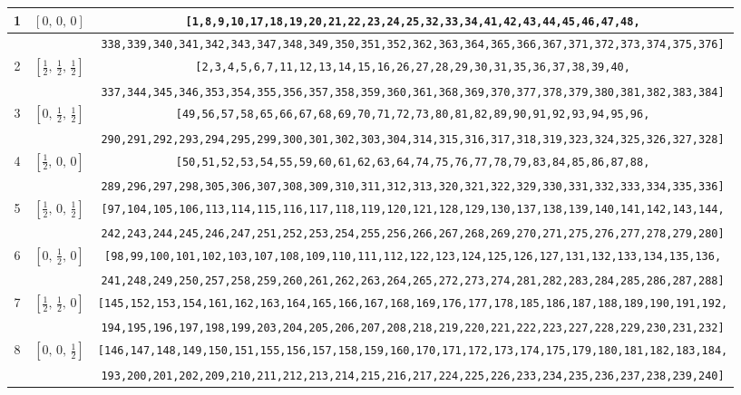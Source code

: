 \documentclass[fleqn,8pt]{jsarticle}
\begin{document}
\begin{longtable}{ccc}
1 & $\left[ 0,\, 0,\, 0 \right]$ & {\tt [1,8,9,10,17,18,19,20,21,22,23,24,25,32,33,34,41,42,43,44,45,46,47,48,} \\ \hline
 &  & {\tt 338,339,340,341,342,343,347,348,349,350,351,352,362,363,364,365,366,367,371,372,373,374,375,376]} \\ \hline
2 & $\left[ \frac{1}{2},\, \frac{1}{2},\, \frac{1}{2} \right]$ & {\tt [2,3,4,5,6,7,11,12,13,14,15,16,26,27,28,29,30,31,35,36,37,38,39,40,} \\ \hline
 &  & {\tt 337,344,345,346,353,354,355,356,357,358,359,360,361,368,369,370,377,378,379,380,381,382,383,384]} \\ \hline
3 & $\left[ 0,\, \frac{1}{2},\, \frac{1}{2} \right]$ & {\tt [49,56,57,58,65,66,67,68,69,70,71,72,73,80,81,82,89,90,91,92,93,94,95,96,} \\ \hline
 &  & {\tt 290,291,292,293,294,295,299,300,301,302,303,304,314,315,316,317,318,319,323,324,325,326,327,328]} \\ \hline
4 & $\left[ \frac{1}{2},\, 0,\, 0 \right]$ & {\tt [50,51,52,53,54,55,59,60,61,62,63,64,74,75,76,77,78,79,83,84,85,86,87,88,} \\ \hline
 &  & {\tt 289,296,297,298,305,306,307,308,309,310,311,312,313,320,321,322,329,330,331,332,333,334,335,336]} \\ \hline
5 & $\left[ \frac{1}{2},\, 0,\, \frac{1}{2} \right]$ & {\tt [97,104,105,106,113,114,115,116,117,118,119,120,121,128,129,130,137,138,139,140,141,142,143,144,} \\ \hline
 &  & {\tt 242,243,244,245,246,247,251,252,253,254,255,256,266,267,268,269,270,271,275,276,277,278,279,280]} \\ \hline
6 & $\left[ 0,\, \frac{1}{2},\, 0 \right]$ & {\tt [98,99,100,101,102,103,107,108,109,110,111,112,122,123,124,125,126,127,131,132,133,134,135,136,} \\ \hline
 &  & {\tt 241,248,249,250,257,258,259,260,261,262,263,264,265,272,273,274,281,282,283,284,285,286,287,288]} \\ \hline
7 & $\left[ \frac{1}{2},\, \frac{1}{2},\, 0 \right]$ & {\tt [145,152,153,154,161,162,163,164,165,166,167,168,169,176,177,178,185,186,187,188,189,190,191,192,} \\ \hline
 &  & {\tt 194,195,196,197,198,199,203,204,205,206,207,208,218,219,220,221,222,223,227,228,229,230,231,232]} \\ \hline
8 & $\left[ 0,\, 0,\, \frac{1}{2} \right]$ & {\tt [146,147,148,149,150,151,155,156,157,158,159,160,170,171,172,173,174,175,179,180,181,182,183,184,} \\ \hline
 &  & {\tt 193,200,201,202,209,210,211,212,213,214,215,216,217,224,225,226,233,234,235,236,237,238,239,240]} \\
\end{longtable}
\end{document}
